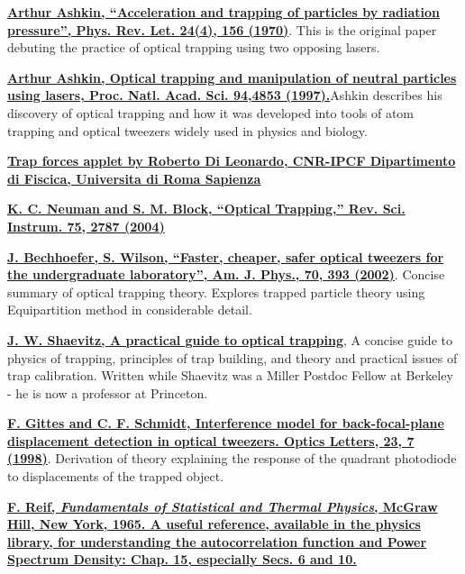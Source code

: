 \documentclass{../lab}
\begin{document}
\begin{thebibliography}{}
\label{sec:References}
     \href{https://journals.aps.org/prl/pdf/10.1103/PhysRevLett.24.156}{\textbf{Arthur Ashkin, ``Acceleration and trapping of particles by radiation pressure'', Phys. Rev. Let. \textbf{24}(4), 156 (1970)}}. This is the original paper debuting the practice of optical trapping using two opposing lasers.

     \href{https://www.damtp.cam.ac.uk/user/gold/pdfs/teaching/ufk_papers/optical_tweezers/ashkin.pdf}{\textbf{\textbf{Arthur Ashkin, Optical trapping and manipulation of neutral particles using lasers}, Proc. Natl. Acad. Sci. \textbf{94},4853 (1997).}}Ashkin describes his discovery of optical trapping and how it was developed into tools of atom trapping and optical tweezers widely used in physics and biology.

     \href{https://www.roma1.infn.it/~dileorob/content/apps/trapforces.php}{\textbf{Trap forces applet by Roberto Di Leonardo, CNR-IPCF Dipartimento di Fiscica, Universita di Roma Sapienza}}

     \href{https://www.damtp.cam.ac.uk/user/gold/pdfs/neumanblock.pdf}{\textbf{K. C. Neuman and S. M. Block, ``Optical Trapping,'' Rev. Sci. Instrum. \textbf{75}, 2787 (2004)}}

     \href{https://pubs.aip.org/aapt/ajp/article-abstract/70/4/393/1042395/Faster-cheaper-safer-optical-tweezers-for-the?redirectedFrom=fulltext}{\textbf{J. Bechhoefer, S. Wilson, ``Faster, cheaper, safer optical tweezers for the undergraduate laboratory'', Am. J. Phys., \textbf{70}, 393 (2002)}}. Concise summary of optical trapping theory. Explores trapped particle theory using Equipartition method in considerable detail.

     \href{https://genomics.princeton.edu/shaevitzlab/OT_Practicle_Guide.pdf}{\textbf{J. W. Shaevitz, A practical guide to optical trapping}}, A concise guide to physics of trapping, principles of trap building, and theory and practical issues of trap calibration. Written while Shaevitz was a Miller Postdoc Fellow at Berkeley - he is now a professor at Princeton.

     \href{https://opg.optica.org/ol/viewmedia.cfm?uri=ol-23-1-7&seq=0}{\textbf{F. Gittes and C. F. Schmidt, Interference model for back-focal-plane displacement detection in optical tweezers. Optics Letters, \textbf{23}, 7 (1998)}}. Derivation of theory explaining the response of the quadrant photodiode to displacements of the trapped object.

     \href{https://search.library.berkeley.edu/permalink/01UCS_BER/s4lks2/cdi_nii_cinii_1130000795628292096}{    \textbf{F. Reif, \emph{Fundamentals of Statistical and Thermal Physics}, McGraw Hill, New York, 1965. A useful reference, available in the physics library, for understanding the autocorrelation function and Power Spectrum Density: Chap. 15, especially Secs. 6 and 10.}}
    

\end{thebibliography}
\end{document}
